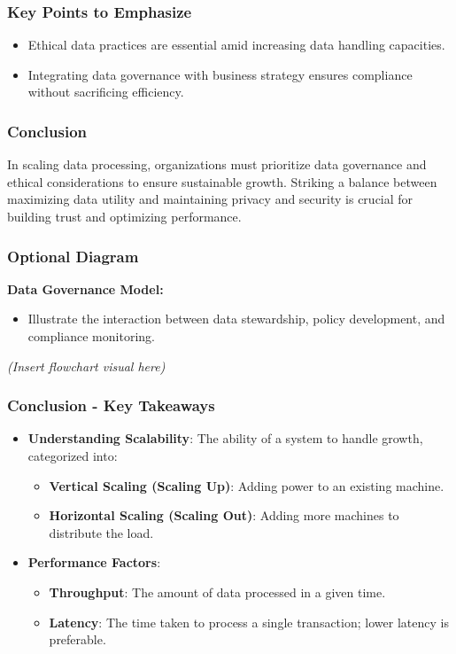 \documentclass[aspectratio=169]{beamer}
\begin{document}
\begin{frame}[fragile]
    \frametitle{Key Points to Emphasize}
    \begin{itemize}
        \item Ethical data practices are essential amid increasing data handling capacities.
        \item Integrating data governance with business strategy ensures compliance without sacrificing efficiency.
    \end{itemize}
\end{frame}

\begin{frame}[fragile]
    \frametitle{Conclusion}
    In scaling data processing, organizations must prioritize data governance and ethical considerations to ensure sustainable growth. Striking a balance between maximizing data utility and maintaining privacy and security is crucial for building trust and optimizing performance.
\end{frame}

\begin{frame}[fragile]
    \frametitle{Optional Diagram}
    \textbf{Data Governance Model:}
    \begin{itemize}
        \item Illustrate the interaction between data stewardship, policy development, and compliance monitoring.
    \end{itemize}
    \textit{(Insert flowchart visual here)}
\end{frame}

\begin{frame}[fragile]
    \frametitle{Conclusion - Key Takeaways}
    \begin{itemize}
        \item \textbf{Understanding Scalability}: The ability of a system to handle growth, categorized into:
        \begin{itemize}
            \item \textbf{Vertical Scaling (Scaling Up)}: Adding power to an existing machine.
            \item \textbf{Horizontal Scaling (Scaling Out)}: Adding more machines to distribute the load.
        \end{itemize}
        
        \item \textbf{Performance Factors}:
        \begin{itemize}
            \item \textbf{Throughput}: The amount of data processed in a given time.
            \item \textbf{Latency}: The time taken to process a single transaction; lower latency is preferable.
        \end{itemize}
    \end{itemize}
\end{frame}
\end{document}
